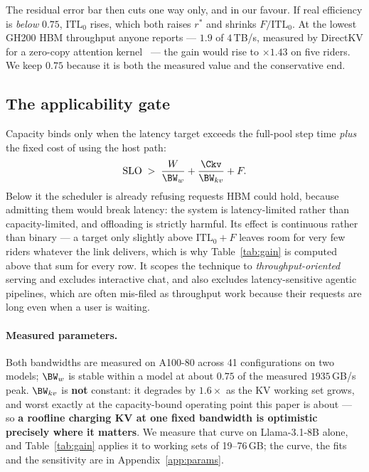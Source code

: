 The residual error bar then cuts one way only, and in our favour. If real
efficiency is \emph{below} $0.75$, $\mathrm{ITL}_0$ rises, which both raises $r^{*}$
and shrinks $F/\mathrm{ITL}_0$. At the lowest GH200 HBM throughput anyone reports
--- $1.9$ of $4$\,TB/s, measured by DirectKV for a zero-copy attention
kernel~\cite{directkv} --- the gain would rise to $\times 1.43$ on five riders. We
keep $0.75$ because it is both the measured value and the conservative end.

\subsection{The applicability gate}
\label{sec:model:gate}

Capacity binds only when the latency target exceeds the full-pool step time
\emph{plus} the fixed cost of using the host path:
%
\begin{equation}
\label{eq:gate}
\mathrm{SLO} \;>\; \frac{W}{\BW_w} + \frac{\Ckv}{\BW_{kv}} + F.
\end{equation}
%
Below it the scheduler is already refusing requests HBM could hold, because
admitting them would break latency: the system is latency-limited rather than
capacity-limited, and offloading is strictly harmful. Its effect is continuous
rather than binary --- a target only slightly above $\mathrm{ITL}_0 + F$ leaves room
for very few riders whatever the link delivers, which is why Table~\ref{tab:gain} is
computed above that sum for every row. It scopes the technique to
\emph{throughput-oriented} serving and excludes interactive chat, and also excludes
latency-sensitive agentic pipelines, which are often mis-filed as throughput work
because their requests are long even when a user is waiting.

\paragraph{Measured parameters.}
\label{sec:model:params}
Both bandwidths are measured on A100-80 across 41 configurations on two models;
$\BW_w$ is stable within a model at about $0.75$ of the measured $1935$\,GB/s peak.
$\BW_{kv}$ is \textbf{not} constant: it degrades by $1.6\times$ as the KV working
set grows, and worst exactly at the capacity-bound operating point this paper is
about --- so \textbf{a roofline charging KV at one fixed bandwidth is optimistic
precisely where it matters}. We measure that curve on Llama-3.1-8B alone, and
Table~\ref{tab:gain} applies it to working sets of 19--76\,GB; the curve, the fits
and the sensitivity are in Appendix~\ref{app:params}.

